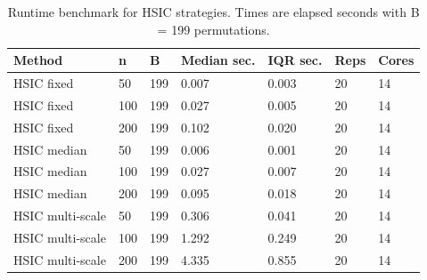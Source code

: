 \begin{table}[!htbp]
\centering
\scriptsize
\caption{Runtime benchmark for HSIC strategies. Times are elapsed seconds with B = 199 permutations.}
\label{tab:runtime}
\begin{tabular}{lllllll}
\toprule
Method & n & B & Median sec. & IQR sec. & Reps & Cores
\\
\midrule
HSIC fixed &  50 & 199 & 0.007 & 0.003 & 20 & 14\\
HSIC fixed & 100 & 199 & 0.027 & 0.005 & 20 & 14\\
HSIC fixed & 200 & 199 & 0.102 & 0.020 & 20 & 14\\
HSIC median &  50 & 199 & 0.006 & 0.001 & 20 & 14\\
HSIC median & 100 & 199 & 0.027 & 0.007 & 20 & 14\\
HSIC median & 200 & 199 & 0.095 & 0.018 & 20 & 14\\
HSIC multi-scale &  50 & 199 & 0.306 & 0.041 & 20 & 14\\
HSIC multi-scale & 100 & 199 & 1.292 & 0.249 & 20 & 14\\
HSIC multi-scale & 200 & 199 & 4.335 & 0.855 & 20 & 14\\
\bottomrule
\end{tabular}
\end{table}
